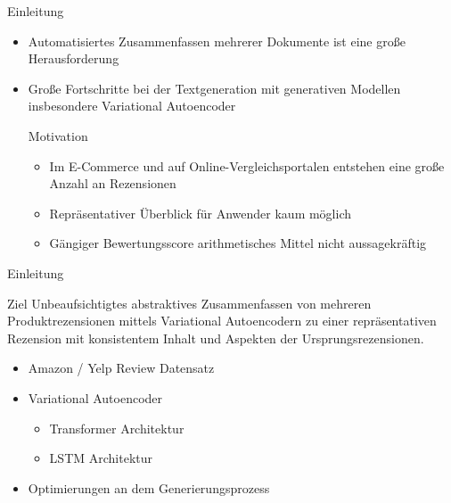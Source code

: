 \begin{frame}{Einleitung}
  \begin{itemize}
      \item Automatisiertes Zusammenfassen mehrerer Dokumente ist eine große Herausforderung
      \item Große Fortschritte bei der Textgeneration mit generativen Modellen insbesondere Variational Autoencoder
      \begin{block}{Motivation}
        \begin{itemize}
          \item Im E-Commerce und auf Online-Vergleichsportalen entstehen eine große Anzahl an Rezensionen
          \item Repräsentativer Überblick für Anwender kaum möglich
          \item Gängiger Bewertungsscore arithmetisches Mittel nicht aussagekräftig
        \end{itemize}
      \end{block}
  \end{itemize}
\end{frame}

\begin{frame}{Einleitung}
  \begin{exampleblock}{Ziel}
    Unbeaufsichtigtes abstraktives Zusammenfassen von mehreren Produktrezensionen mittels Variational Autoencodern zu einer repräsentativen Rezension mit konsistentem Inhalt und Aspekten der Ursprungsrezensionen.
  \end{exampleblock}
  \begin{itemize}
      \item Amazon / Yelp Review Datensatz
      \item Variational Autoencoder \begin{itemize} \item Transformer Architektur \item LSTM Architektur \end{itemize}
      \item Optimierungen an dem Generierungsprozess
  \end{itemize}
\end{frame}

